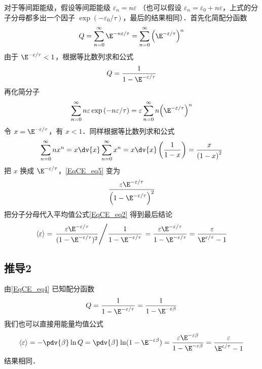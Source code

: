 对于等间距能级，假设等间距能级 ${\varepsilon_n} = n\varepsilon$ （也可以假设 ${\varepsilon_n} = {\varepsilon_0} + n\varepsilon $，上式的分子分母都多出一个因子 $\exp ( - {\varepsilon_0}/\tau )$，最后的结果相同）．首先化简配分函数
\begin{equation}
Q = \sum\limits_{n = 0}^\infty  {\E^{ - n\varepsilon /\tau }}  = \sum\limits_{n = 0}^\infty  {{\left( {\E^{ - \varepsilon /\tau }} \right)}^n} 
\end{equation}
由于 ${\E^{ - \varepsilon /\tau }} < 1$，根据等比数列求和公式 %
\begin{equation}\label{EqCE_eq4}
Q = \frac{1}{1 - {\E^{ - \varepsilon /\tau }}}
\end{equation}
再化简分子
\begin{equation}\label{EqCE_eq5}
\sum\limits_{n = 0}^\infty  {n\varepsilon \exp \left( { - n\varepsilon /\tau } \right)}  = \varepsilon \sum\limits_{n = 0}^\infty  {n{{\left( {\E^{ - \varepsilon /\tau }} \right)}^n}}
\end{equation}
令 $x = {\E^{ - \varepsilon /\tau }}$，有 $x < 1$．同样根据等比数列求和公式
\begin{equation}
\sum\limits_{n = 0}^\infty  {n{x^n}}  = x\dv{x}\sum\limits_{n = 0}^\infty  {x^n}  = x\dv{x}\left( {\frac{1}{1 - x}} \right) = \frac{x}{{\left( {1 - x} \right)}^2}
\end{equation}
把 $x$ 换成 ${\E^{ - \varepsilon /\tau }}$，\autoref{EqCE_eq5} 变为
\begin{equation}
\frac{\varepsilon {\E^{ - \varepsilon /\tau }}}{{\left( {1 - {\E^{ - \varepsilon /\tau }}} \right)}^2}
\end{equation}
把分子分母代入平均值公式\autoref{EqCE_eq2} 得到最后结论
\begin{equation}
\langle \varepsilon \rangle = \left. \frac{\varepsilon \E^{-\varepsilon/\tau}}{(1 - \E^{-\varepsilon /\tau})^2} \middle/ \frac{1}{1 - \E^{-\varepsilon/\tau}}  \right. = \frac{\varepsilon \E^{-\varepsilon/\tau}}{1 - \E^{-\varepsilon/\tau}} = \frac{\varepsilon}{\E^{\varepsilon/\tau} - 1}
\end{equation}

\subsection{推导2}
由\autoref{EqCE_eq4} 已知配分函数
\begin{equation}
Q = \frac{1}{1 - {\E^{ - \varepsilon /\tau }}} = \frac{1}{1 - {\E^{ - \varepsilon\beta }}}
\end{equation}
我们也可以直接用能量均值公式
\begin{equation}
\langle\varepsilon\rangle = -\pdv{\beta} \ln Q
= \pdv{\beta} \ln (1 - {\E^{ - \varepsilon \beta }}) = \frac{\varepsilon {\E^{ - \varepsilon \beta }}}{1 - {\E^{ - \varepsilon \beta }}} = \frac{\varepsilon }{{\E^{\varepsilon /\tau }} - 1}
\end{equation}
结果相同．
